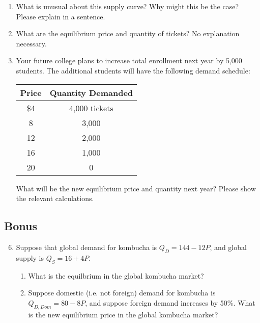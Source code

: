 \documentclass{article}
\begin{document}
\begin{enumerate}
	\begin{enumerate}
	
	\item What is unusual about this supply curve? Why might this be the case? Please explain in a sentence.
	
	\item What are the equilibrium price and quantity of tickets? No explanation necessary. 
	
	\item Your future college plans to increase total enrollment next year by 5,000 students. The additional students will have the following demand schedule:
	
	\begin{center}
	\begin{tabular}{c c}
	\textbf{Price} & \textbf{Quantity Demanded} \\
	\hline
	\$4 & 4,000 tickets \\
	8 & 3,000 \\
	12 & 2,000 \\
	16 & 1,000 \\
	20 & 0 \\
	\end{tabular}
	\end{center}
	
	What will be the new equilibrium price and quantity next year? Please show the relevant calculations. 
	
	\end{enumerate}
	
\end{enumerate}

\subsection*{Bonus}

\begin{enumerate}
\setcounter{enumi}{5}
	

\item Suppose that global demand for kombucha is $Q_D = 144 - 12P$, and global supply is $Q_S = 16 + 4P$.

	\begin{enumerate}
	
	\item What is the equilbrium in the global kombucha market?
	
	\item Suppose domestic (i.e. not foreign) demand for kombucha is \\ $Q_{D,Dom} = 80 - 8P$, and suppose foreign demand increases by 50\%. What is the new equilibrium price in the global kombucha market?
	
	\end{enumerate}

\end{enumerate}
\end{document}
